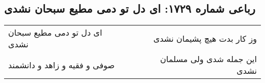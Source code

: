 \begin{center}
\section*{رباعی شماره ۱۷۲۹: ای دل تو دمی مطیع سبحان نشدی}
\label{sec:1729}
\begin{longtable}{l p{0.5cm} r}
ای دل تو دمی مطیع سبحان نشدی
&&
وز کار بدت هیچ پشیمان نشدی
\\
صوفی و فقیه و زاهد و دانشمند
&&
این جمله شدی ولی مسلمان نشدی
\\
\end{longtable}
\end{center}
